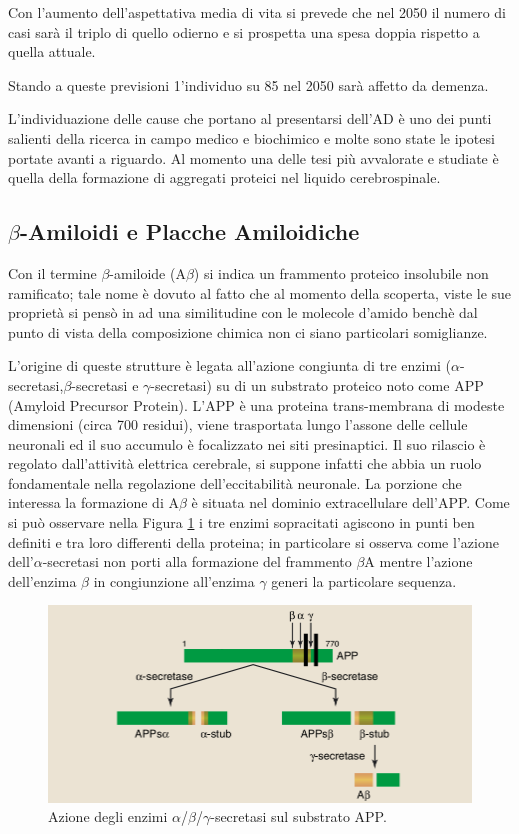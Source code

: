 \documentclass[a4paper, 12pt]{article}
\begin{document}
Con l'aumento dell'aspettativa media di vita si prevede che nel 2050 il numero di casi sarà il triplo di quello odierno e si prospetta una spesa doppia rispetto a quella attuale.\cite{noauthor_world_2018}

Stando a queste previsioni 1'individuo su 85 nel 2050 sarà affetto da demenza.

L'individuazione delle cause che portano al presentarsi dell'AD è uno dei punti salienti della ricerca in campo medico e biochimico e molte sono state le ipotesi portate avanti a riguardo. Al momento una delle tesi più avvalorate e studiate è quella della formazione di aggregati proteici nel liquido cerebrospinale.

\subsection{$\beta$-Amiloidi e Placche Amiloidiche}
\label{sec:ab}
Con il termine $\beta$-amiloide (A$\beta$) si indica un frammento proteico insolubile non ramificato; tale nome è dovuto al fatto che al momento della scoperta, viste le sue proprietà si pensò in ad una similitudine con le molecole d'amido benchè dal punto di vista della composizione chimica non ci siano particolari somiglianze.\cite{lennarz_encyclopedia_2004}

L'origine di queste strutture è legata all'azione congiunta di tre enzimi ($\alpha$-secretasi,$\beta$-secretasi e $\gamma$-secretasi) su di un substrato proteico noto come APP (Amyloid Precursor Protein). L'APP è una proteina trans-membrana di modeste dimensioni (circa 700 residui), viene trasportata lungo l'assone delle cellule neuronali ed il suo accumulo è focalizzato nei siti presinaptici. Il suo rilascio è regolato dall'attività elettrica cerebrale, si suppone infatti che abbia un ruolo fondamentale nella regolazione dell'eccitabilità neuronale.\cite{mattson_cellular_1997}
La porzione che interessa la formazione di A$\beta$ è situata nel dominio extracellulare dell'APP. Come si può osservare nella Figura \ref{fig:app} i tre enzimi sopracitati agiscono in punti ben definiti e tra loro differenti della proteina; in particolare si osserva come l'azione dell'$\alpha$-secretasi non porti alla formazione del frammento $\beta$A mentre l'azione dell'enzima $\beta$ in congiunzione all'enzima $\gamma$ generi la particolare sequenza.\cite{goedert_century_2006}

\begin{figure}[H]
	\includegraphics[width=\linewidth]{immagini/APP.png}
	\caption{Azione degli enzimi $\alpha$/$\beta$/$\gamma$-secretasi sul substrato APP.}
	\label{fig:app}
\end{figure}
\end{document}
